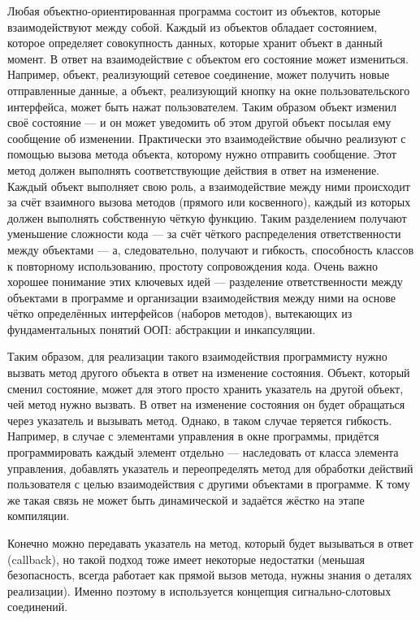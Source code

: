 Любая объектно-ориентированная программа состоит из объектов, которые взаимодействуют между собой. Каждый из объектов
обладает состоянием, которое определяет совокупность данных, которые хранит объект в данный момент. В ответ на
взаимодействие с объектом его состояние может измениться. 
Например, объект, реализующий сетевое соединение, может получить новые отправленные
данные, а объект, реализующий кнопку на окне пользовательского интерфейса, 
может быть нажат пользователем. Таким образом объект изменил своё состояние --- 
и он может уведомить об этом другой объект посылая ему сообщение об 
изменении.
Практически это взаимодействие обычно реализуют с помощью вызова метода объекта, которому нужно
отправить сообщение. Этот метод должен выполнять соответствующие действия в ответ на изменение. Каждый объект выполняет
свою роль, а взаимодействие между ними происходит за счёт взаимного вызова методов (прямого или косвенного), каждый из
которых должен выполнять собственную чёткую функцию. Таким разделением получают уменьшение сложности кода --- за счёт
чёткого распределения ответственности между объектами --- а, следовательно, получают и гибкость, способность классов к
повторному использованию, простоту сопровождения кода. Очень важно хорошее понимание этих ключевых идей ---
разделение ответственности между объектами в программе и организации взаимодействия между ними на основе чётко
определённых интерфейсов (наборов методов), вытекающих из фундаментальных понятий ООП: абстракции и инкапсуляции.

Таким образом, для реализации такого взаимодействия программисту нужно вызвать метод другого объекта в ответ на
изменение состояния. Объект, который сменил состояние, может для этого просто хранить указатель на другой объект, чей
метод нужно вызвать. В ответ на изменение состояния он будет обращаться через указатель и вызывать метод. Однако, в
таком случае теряется гибкость. Например, в случае с элементами управления в  окне программы, придётся программировать
каждый элемент отдельно --- наследовать от класса элемента управления, добавлять указатель и  переопределять метод для
обработки действий пользователя с целью взаимодействия с другими объектами в программе. К тому же такая связь не может
быть динамической и задаётся жёстко на этапе компиляции.

Конечно можно передавать указатель на метод, который будет вызываться в ответ (callback), но такой подход тоже имеет
некоторые недостатки (меньшая безопасность, всегда работает как прямой вызов метода, нужны знания о деталях
реализации). Именно поэтому в  используется концепция сигнально-слотовых соединений.

